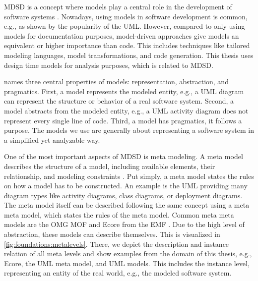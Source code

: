 \acf{MDSD} is a concept where models play a central role in the development of software systems \cite{stahl_model-driven_2006}.
Nowadays, using models in software development is common, e.g., as shown by the popularity of the \acf{UML}.
However, compared to only using models for documentation purposes, model-driven approaches give models an equivalent or higher importance than code.
This includes techniques like tailored modeling languages, model transformations, and code generation.
This thesis uses design time models for analysis purposes, which is related to \ac{MDSD}.

\textcite{stachowiak_allgemeine_1973} names three central properties of models: representation, abstraction, and pragmatics.
First, a model represents the modeled entity, e.g., a \ac{UML} diagram can represent the structure or behavior of a real software system.
Second, a model abstracts from the modeled entity, e.g., a \ac{UML} activity diagram does not represent every single line of code.
Third, a model has pragmatics, it follows a purpose.
The models we use are generally about representing a software system in a simplified yet analyzable way.

One of the most important aspects of \ac{MDSD} is meta modeling.
A meta model describes the structure of a model, including available elements, their relationship, and modeling constraints \cite{stahl_model-driven_2006}.
Put simply, a meta model states the rules on how a model has to be constructed.
An example is the \ac{UML} providing many diagram types like activity diagrams, class diagrams, or deployment diagrams.
The meta model itself can be described following the same concept using a meta meta model, which states the rules of the meta model.
Common meta meta models are the \ac{OMG} \acf{MOF} \cite{omg_about_2016} and Ecore from the \acf{EMF} \cite{steinberg_emf_2008}.
Due to the high level of abstraction, these models can describe themselves.
This is visualized in \autoref{fig:foundations:metalevels}.
There, we depict the description and instance relation of all meta levels and show examples from the domain of this thesis, e.g., Ecore, the \ac{UML} meta model, and \ac{UML} models.
This includes the instance level, representing an entity of the real world, e.g., the modeled software system.






